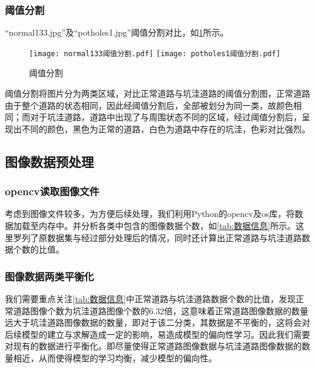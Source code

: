 \documentclass{MathorCupmodeling}
\begin{document}
	\subsubsection{阈值分割}
	“normal133.jpg”及“potholes1.jpg”阈值分割对比，如\textcolor{blue}{\cref{fig:阈值分割}}所示。
	\begin{figure}[H]
		\centering
		\texttt{[image: normal133阈值分割.pdf]}
		\hspace{0.3in}
		\texttt{[image: potholes1阈值分割.pdf]}
		\caption{阈值分割}
		\label{fig:阈值分割}
	\end{figure}
	阈值分割将图片分为两类区域，对比正常道路与坑洼道路的阈值分割图，正常道路由于整个道路的状态相同，因此经阈值分割后，全部被划分为同一类，故颜色相同；而对于坑洼道路，道路中出现了与周围状态不同的区域，经过阈值分割后，呈现出不同的颜色，黑色为正常的道路，白色为道路中存在的坑洼，色彩对比强烈。

	\subsection{图像数据预处理}
	\subsubsection{opencv读取图像文件}
	考虑到图像文件较多，为方便后续处理，我们利用Python的opencv及os库，将数据加载至内存中。并分析各类中包含的图像数据个数，如\textcolor{blue}{\cref{tab:数据信息}}所示。这里罗列了原数据集与经过\textcolor{blue}{}部分处理后的情况，同时还计算出正常道路与坑洼道路数据个数的比值。

\begin{table}[H]
	\centering
	\caption{数据信息}
	\label{tab:数据信息}
\end{table}
	
	\subsubsection{图像数据两类平衡化}
	我们需要重点关注\textcolor{blue}{\cref{tab:数据信息}}中正常道路与坑洼道路数据个数的比值，发现正常道路图像个数为坑洼道路图像个数的6.32倍，这意味着正常道路图像数据的数量远大于坑洼道路图像数据的数量，即对于该二分类，其数据是不平衡的，这将会对后续模型的建立与求解造成一定的影响，易造成模型的偏向性学习。因此我们需要对现有的数据进行平衡化。即尽量使得正常道路图像数据与坑洼道路图像数据的数量相近，从而使得模型的学习均衡，减少模型的偏向性。
\end{document}
